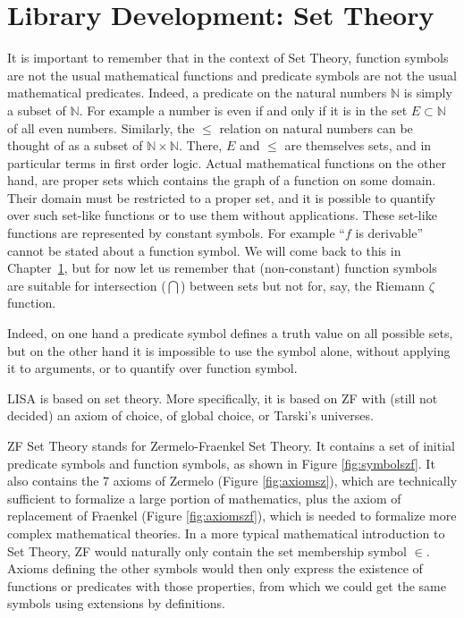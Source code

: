 
\chapter{Library Development: Set Theory}
\label{chapt:settheory}

It is important to remember that in the context of Set Theory, function symbols are not the usual mathematical functions and predicate symbols are not the usual mathematical predicates. Indeed, a predicate on the natural numbers $\mathbb N$ is simply a subset of $\mathbb N$. For example a number is even if and only if it is in the set $E \subset \mathbb N$ of all even numbers. Similarly, the $\leq$ relation on natural numbers can be thought of as a subset of $\mathbb N \times \mathbb N$. There, $E$ and $\leq$ are themselves sets, and in particular terms in first order logic.
Actual mathematical functions on the other hand, are proper sets which contains the graph of a function on some domain. Their domain must be restricted to a proper set, and it is possible to quantify over such set-like functions or to use them without applications. These set-like functions are represented by constant symbols.  For example ``$f$ is derivable'' cannot be stated about a function symbol. We will come back to this in Chapter~\ref{chapt:settheory}, but for now let us remember that (non-constant) function symbols are suitable for intersection ($\bigcap$) between sets but not for, say, the Riemann $\zeta$ function.


Indeed, on one hand a predicate symbol defines a truth value on all possible sets, but on the other hand it is impossible to use the symbol alone, without applying it to arguments, or to quantify over function symbol.

LISA is based on set theory. More specifically, it is based on ZF with (still not decided) an axiom of choice, of global choice, or Tarski's universes.

ZF Set Theory stands for Zermelo-Fraenkel Set Theory. It contains a set of initial predicate symbols and function symbols, as shown in Figure \ref{fig:symbolszf}. It also contains the 7 axioms of Zermelo (Figure \ref{fig:axiomsz}), which are technically sufficient to formalize a large portion of mathematics, plus the axiom of replacement of Fraenkel (Figure \ref{fig:axiomszf}), which is needed to formalize more complex mathematical theories.
In a more typical mathematical introduction to Set Theory, ZF would naturally only contain the set membership symbol $\in$. Axioms defining the other symbols would then only express the existence of functions or predicates with those properties, from which we could get the same symbols using extensions by definitions.

